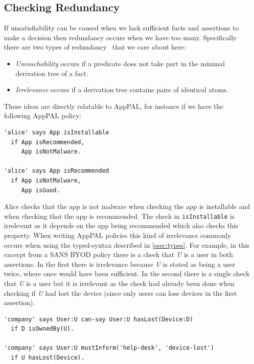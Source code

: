 \documentclass[thesis.tex]{subfiles}
\begin{document}
\subsection{Checking Redundancy}
\label{ssec:redundancy}

If unsatisfiability can be caused when we lack sufficient facts and assertions
to make a decision then redundancy occurs when we have too many. Specifically
there are two types of redundancy~\cite{alon_levy_constraints_1992} that we care
about here:

\begin{itemize}
\item \emph{Unreachability} occurs if a predicate does not take part in the
  minimal derivation tree of a fact.
\item \emph{Irrelevance} occurs if a derivation tree contains pairs of identical atoms.
\end{itemize}

These ideas are directly relatable to AppPAL, for instance if we have the
following AppPAL policy:

\begin{lstlisting}
'alice' says App isInstallable
  if App isRecommended,
     App isNotMalware.

'alice' says App isRecommended
  if App isNotMalware,
     App isGood.
\end{lstlisting}

Alice checks that the app is not malware when checking the app is
installable and when checking that the app is recommended.  The check
in \texttt{isInstallable} is irrelevant as it depends on the app being
recommended which also checks this property.  When writing AppPAL
policies this kind of irrelevance commonly occurs when using the
typed-syntax described in \autoref{ssec:types}. For example, in this
excerpt from a SANS BYOD policy there is a check that \emph{U} is a
user in both assertions.  In the first there is irrelevance because
\emph{U} is stated as being a user twice, where once would have been
sufficient.  In the second there is a single check that \emph{U} is a
user but it is irrelevant as the check had already been done when
checking if \emph{U} had lost the device (since only users can lose
devices in the first assertion).

\begin{lstlisting}
'company' says User:U can-say User:U hasLost(Device:D)
  if D isOwnedBy(U).

'company' says User:U mustInform('help-desk', 'device-lost')
  if U hasLost(Device).
\end{lstlisting}
\end{document}
